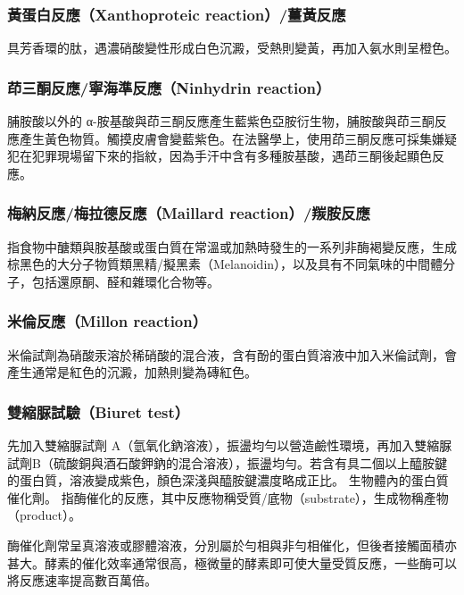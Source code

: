 \documentclass[a4paper,12pt]{report}
\begin{document}
\begin{itemize}
\begin{itemize}
\subsubsection{黃蛋白反應（Xanthoproteic reaction）/薑黃反應}
具芳香環的肽，遇濃硝酸變性形成白色沉澱，受熱則變黃，再加入氨水則呈橙色。
\subsubsection{茚三酮反應/寧海準反應（Ninhydrin reaction）}
脯胺酸以外的 α-胺基酸與茚三酮反應產生藍紫色亞胺衍生物，脯胺酸與茚三酮反應產生黃色物質。觸摸皮膚會變藍紫色。在法醫學上，使用茚三酮反應可採集嫌疑犯在犯罪現場留下來的指紋，因為手汗中含有多種胺基酸，遇茚三酮後起顯色反應。
\subsubsection{梅納反應/梅拉德反應（Maillard reaction）/羰胺反應}
指食物中醣類與胺基酸或蛋白質在常溫或加熱時發生的一系列非酶褐變反應，生成棕黑色的大分子物質類黑精/擬黑素（Melanoidin），以及具有不同氣味的中間體分子，包括還原酮、醛和雜環化合物等。
\subsubsection{米倫反應（Millon reaction）}
米倫試劑為硝酸汞溶於稀硝酸的混合液，含有酚的蛋白質溶液中加入米倫試劑，會產生通常是紅色的沉澱，加熱則變為磚紅色。
\subsubsection{雙縮脲試驗（Biuret test）}
先加入雙縮脲試劑 A（氫氧化鈉溶液），振盪均勻以營造鹼性環境，再加入雙縮脲試劑B（硫酸銅與酒石酸鉀鈉的混合溶液），振盪均勻。若含有具二個以上醯胺鍵的蛋白質，溶液變成紫色，顏色深淺與醯胺鍵濃度略成正比。
生物體內的蛋白質催化劑。
指酶催化的反應，其中反應物稱受質/底物（substrate），生成物稱產物（product）。

酶催化劑常呈真溶液或膠體溶液，分別屬於勻相與非勻相催化，但後者接觸面積亦甚大。酵素的催化效率通常很高，極微量的酵素即可使大量受質反應，一些酶可以將反應速率提高數百萬倍。


\end{itemize}
\end{itemize}
\end{document}
